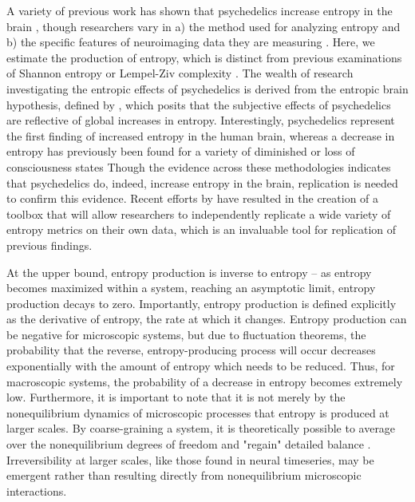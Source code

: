 A variety of previous work has shown that psychedelics increase entropy in the brain \parencite{Carhart-Harris2014, Lebedev2015, Tagliazucchi2014, Lebedev2016, Kringelbach2020a, Viol2017, Barrett2020, Varley2020, Luppi2023a},
though researchers vary in a) the method used for analyzing entropy and b) the specific features of neuroimaging data they are measuring \parencite{Shinozuka2023,McCulloch2022,McCulloch2023}. Here, we estimate the production of entropy, which is distinct from previous examinations of Shannon entropy or Lempel-Ziv complexity \parencite{Tagliazucchi2014,Lempel1976,Ziv1977}. The wealth of research investigating the entropic effects of psychedelics is derived from the entropic brain hypothesis, defined by \textcite{Carhart-Harris2014}, which posits that the subjective effects of psychedelics are reflective of global increases in entropy. Interestingly, psychedelics represent the first finding of increased entropy in the human brain, whereas a decrease in entropy has previously been found for a variety of diminished or loss of consciousness states \parencite{Zhang2001, Casali2013, Abasolo2015, Mediano2021} Though the evidence across these methodologies indicates that psychedelics do, indeed, increase entropy in the brain, replication is needed to confirm this evidence. Recent efforts by \textcite{McCulloch2023} have resulted in the creation of a toolbox that will allow researchers to independently replicate a wide variety of entropy metrics on their own data, which is an invaluable tool for replication of previous findings.

At the upper bound, entropy production is inverse to entropy -- as entropy becomes maximized within a system, reaching an asymptotic limit, entropy production decays to zero. Importantly, entropy production is defined explicitly as the derivative of entropy, the rate at which it changes. Entropy production can be negative for microscopic systems, but due to fluctuation theorems, the probability that the reverse, entropy-producing process will occur decreases exponentially with the amount of entropy which needs to be reduced. Thus, for macroscopic systems, the probability of a decrease in entropy becomes extremely low. Furthermore, it is important to note that it is not merely by the nonequilibrium dynamics of microscopic processes that entropy is produced at larger scales. By coarse-graining a system, it is theoretically possible to average over the nonequilibrium degrees of freedom and "regain" detailed balance \parencite{Lynn2021,Esposito2012,Martinez2019}. Irreversibility at larger scales, like those found in neural timeseries, may be emergent rather than resulting directly from nonequilibrium microscopic interactions.

